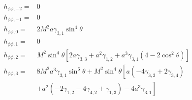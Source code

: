 \begin{eqnarray}
&h_{\phi\phi,-2}=&0\nonumber\\
&h_{\phi\phi,-1}=&0\nonumber\\ 
&h_{\phi\phi,0}=&2M^{2}a\gamma_{3,1}\sin^{4}\theta\nonumber\\
&h_{\phi\phi,1}=&0 \nonumber\\
&h_{\phi\phi,2}=&M^{2}\sin^{4}\theta\left[ 2a\gamma_{3,3}+a^{2}\gamma_{1,2}+a^{3}\gamma_{3,1}\left( 4-2\cos^{2}\theta \right) \right] \nonumber\\
&h_{\phi\phi,3}= & 8M^{2}a^{3}\gamma_{3,1}\sin^{6}\theta + M^{2}\sin^{4}\theta\left[ a\left(-4\gamma_{3,3}+2\gamma_{3,4} \right)\right.\nonumber\\
&&\left.+a^{2}\left( -2\gamma_{1,2} -4\gamma_{4,2}+\gamma_{1,3} \right)-4a^{3}\gamma_{3,1} \right] \label{eq:bigEqend}
\end{eqnarray}

